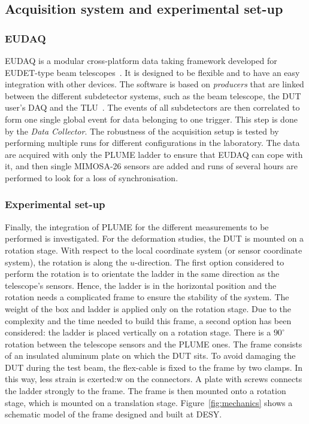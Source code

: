     \subsection{Acquisition system and experimental set-up}
      
      \subsubsection{EUDAQ}

      EUDAQ is a modular cross-platform data taking framework developed for EUDET-type beam telescopes~\cite{Jansen}.
      It is designed to be flexible and to have an easy integration with other devices.
      The software is based on \textit{producers} that are linked between the different subdetector systems, such as the beam telescope, the \gls{DUT} user's DAQ and the \gls{TLU}~\cite{Cussans2009}.
      The events of all subdetectors are then correlated to form one single global event for data belonging to one trigger.
      This step is done by the \textit{Data Collector}.
      The robustness of the acquisition setup is tested by performing multiple runs for different configurations in the laboratory.
      The data are acquired with only the \gls{PLUME} ladder to ensure that EUDAQ can cope with it, and then single \gls{MIMOSA}-26 sensors are added and runs of several hours are performed to look for a loss of synchronisation.

      \subsubsection{Experimental set-up}

      Finally, the integration of \gls{PLUME} for the different measurements to be performed is investigated.
      For the deformation studies, the \gls{DUT} is mounted on a rotation stage. 
      With respect to the local coordinate system (or sensor coordinate system), the rotation is along the $u$-direction. 
      The first option considered to perform the rotation is to orientate the ladder in the same direction as the telescope's sensors. 
      Hence, the ladder is in the horizontal position and the rotation needs a complicated frame to ensure the stability of the system.
      The weight of the box and ladder is applied only on the rotation stage. 
      Due to the complexity and the time needed to build this frame, a second option has been considered: the ladder is placed vertically on a rotation stage. 
      There is a $90^{\circ}$ rotation between the telescope sensors and the \gls{PLUME} ones.
      The frame consists of an insulated aluminum plate on which the \gls{DUT} sits.
      To avoid damaging the \gls{DUT} during the test beam, the flex-cable is fixed to the frame by two clamps.
      In this way, less strain is exerted:w
       on the connectors. 
      A plate with screws connects the ladder strongly to the frame.
      The frame is then mounted onto a rotation stage, which is mounted on a translation stage.
      Figure~\ref{fig:mechanics} shows a schematic model of the frame designed and built at DESY.
      

